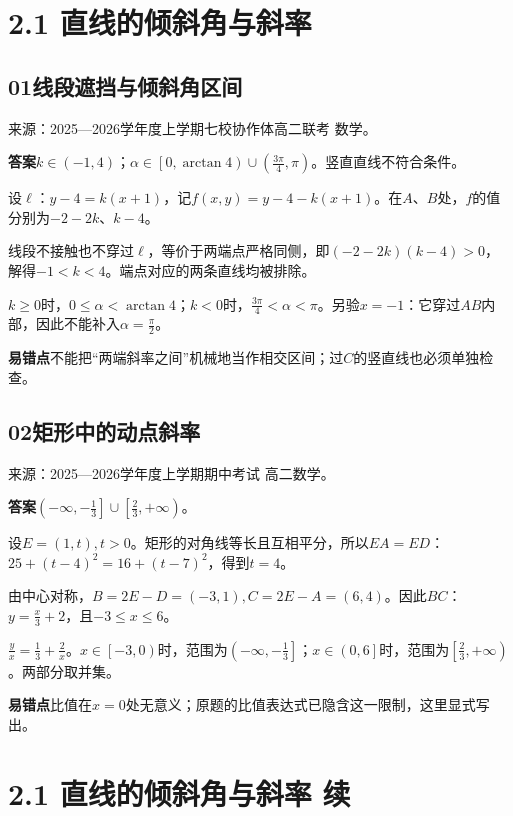\documentclass[UTF8,11pt,a4paper,fontset=windows]{ctexart}
\newcommand{\qhead}[2]{\subsection{#1\texorpdfstring{\quad}{ }#2}}
\newcommand{\qsource}[1]{{\footnotesize 来源：#1。\par}}
\begin{document}
\section{2.1 直线的倾斜角与斜率}


\qhead{01}{线段遮挡与倾斜角区间}
\qsource{2025—2026学年度上学期七校协作体高二联考 数学}
\textbf{答案}\quad \(k\in \left(- 1,\allowbreak 4\right)\)；\(\alpha \in \left[0,\allowbreak \arctan 4\right)\cup \left(\frac{3\pi }{4},\allowbreak \pi \right)\)。竖直直线不符合条件。\par
设\(\ell \)：\(y- 4= k\left(x+ 1\right)\)，记\(f\left(x,\allowbreak y\right)= y- 4- k\left(x+ 1\right)\)。在\(A\)、\(B\)处，\(f\)的值分别为\(- 2- 2k\)、\(k- 4\)。\par
线段不接触也不穿过\(\ell \)，等价于两端点严格同侧，即\(\left(- 2- 2k\right)\left(k- 4\right)> 0\)，解得\(- 1< k< 4\)。端点对应的两条直线均被排除。\par
\(k\ge 0\)时，\(0\le \alpha < \arctan 4\)；\(k< 0\)时，\(\frac{3\pi }{4}< \alpha < \pi \)。另验\(x= - 1\)：它穿过\(AB\)内部，因此不能补入\(\alpha = \frac{\pi }{2}\)。\par
{\small\textbf{易错点}\quad 不能把“两端斜率之间”机械地当作相交区间；过\(C\)的竖直线也必须单独检查。\par}

\qhead{02}{矩形中的动点斜率}
\qsource{2025—2026学年度上学期期中考试 高二数学}
\textbf{答案}\quad \(\left(- \infty ,\allowbreak - \frac{1}{3}\right]\cup \left[\frac{2}{3},\allowbreak + \infty \right)\)。\par
设\(E= \left(1,\allowbreak t\right),\allowbreak t> 0\)。矩形的对角线等长且互相平分，所以\(EA= ED\)：\(25+ \left(t- 4\right)^{2}= 16+ \left(t- 7\right)^{2}\)，得到\(t= 4\)。\par
由中心对称，\(B= 2E- D= \left(- 3,\allowbreak 1\right),\allowbreak C= 2E- A= \left(6,\allowbreak 4\right)\)。因此\(BC\)：\(y= \frac{x}{3}+ 2\)，且\(- 3\le x\le 6\)。\par
\(\frac{y}{x}= \frac{1}{3}+ \frac{2}{x}\)。\(x\in \left[- 3,\allowbreak 0\right)\)时，范围为\(\left(- \infty ,\allowbreak - \frac{1}{3}\right]\)；\(x\in \left(0,\allowbreak 6\right]\)时，范围为\(\left[\frac{2}{3},\allowbreak + \infty \right)\)。两部分取并集。\par
{\small\textbf{易错点}\quad 比值在\(x= 0\)处无意义；原题的比值表达式已隐含这一限制，这里显式写出。\par}

\clearpage

\section{2.1 直线的倾斜角与斜率 续}
\end{document}

